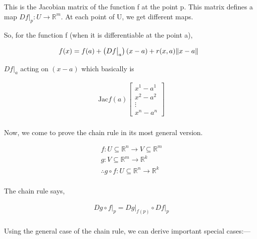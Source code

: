 This is the Jacobian matrix of the function f at the point p. This matrix defines a map $ Df \big|_p : U \longrightarrow \mathbb{R}^m$. At each point of U, we get different maps.

So, for the function f (when it is differentiable at the point a),

\begin{align*}
    & f(x) = f(a) + \left(  Df \big|_a \right) \left(  x-a \right) + r(x,a) \| x-a \| \\
\end{align*}

$ Df \big|_a$ acting on $ (x-a)$ which basically is

\begin{align*}
    & \text{Jac} f(a) \begin{bmatrix} x^1 - a^1 \\ x^2 - a^2 \\ \vdots \\ x^n - a^n \end{bmatrix} \\
\end{align*}

Now, we come to prove the chain rule in its most general version.

\begin{align*}
    & f: U \subseteq \mathbb{R}^n \longrightarrow V \subseteq \mathbb{R}^m \\
    & g: V \subseteq \mathbb{R}^m \longrightarrow \mathbb{R}^k \\
    & \therefore g \circ f : U \subseteq \mathbb{R}^n \longrightarrow \mathbb{R}^k \\
\end{align*}

The chain rule says,

\begin{align*}
    & D g \circ f \big|_p = Dg \big|_{f(p)} \circ Df \big|_p \\
\end{align*}

Using the general case of the chain rule, we can derive important special cases:—

